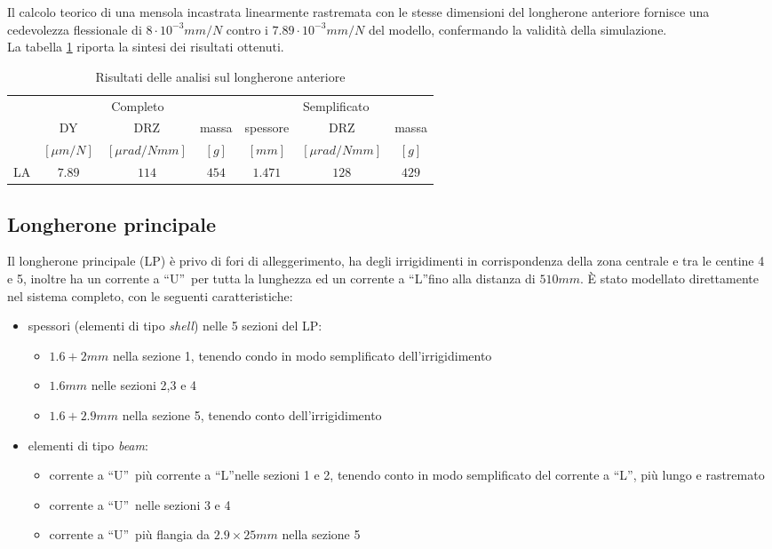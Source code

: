 \documentclass[
10pt, %
a4paper, %
oneside, %
headinclude,footinclude, %
BCOR5mm, %
]{scrartcl}
\begin{document}
Il calcolo teorico di una mensola incastrata linearmente rastremata con le stesse dimensioni del longherone anteriore fornisce una cedevolezza flessionale di $8\cdot10^{-3} mm/N$ contro i $7.89\cdot10^{-3} mm/N$ del modello, confermando la validità della simulazione.\\
La tabella \ref{tab:FS} riporta la sintesi dei risultati ottenuti.

\begin{table}[hbt]
	\caption{Risultati delle analisi sul longherone anteriore}
	\centering
	\begin{tabular}{rcccccc}
		\toprule
		& \multicolumn{3}{c}{Completo} & \multicolumn{3}{c}{Semplificato}\\
		\cmidrule(r){2-4} \cmidrule(l){5-7} 
		& DY  & DRZ & massa & spessore & DRZ  & massa \\
		& $[\mu m/N]$ & $[\mu rad/Nmm]$ & $[g]$ & $[mm]$ & $[\mu rad/Nmm]$ & $[g]$ \\
		\midrule
		LA & $7.89$ & $114$ & $454$ & $1.471$ & $128$ & $429$ \\
		\bottomrule
	\end{tabular}
	\label{tab:FS}
\end{table}


\subsection{Longherone principale}

Il longherone principale (LP) è privo di fori di alleggerimento, ha degli irrigidimenti in corrispondenza della zona centrale e tra le centine 4 e 5, inoltre ha un corrente a \textquotedblleft U\textquotedblright \ per tutta la lunghezza ed un corrente a \textquotedblleft L\textquotedblright fino alla distanza di $510mm$. \`{E} stato modellato direttamente nel sistema completo, con le seguenti caratteristiche:

\begin{itemize}
	\item spessori (elementi di tipo \emph{shell}) nelle 5 sezioni del LP:
	\begin{itemize}
		\item $1.6+2mm$ nella sezione 1, tenendo condo in modo semplificato dell'irrigidimento
		\item $1.6mm$ nelle sezioni 2,3 e 4
		\item $1.6+2.9mm$ nella sezione 5, tenendo conto dell'irrigidimento
	\end{itemize}
	\item elementi di tipo \emph{beam}:
	\begin{itemize}
		\item corrente a \textquotedblleft U\textquotedblright \ più corrente a \textquotedblleft L\textquotedblright nelle sezioni 1 e 2, tenendo conto in modo semplificato del corrente a \textquotedblleft L\textquotedblright, più lungo e rastremato
		\item corrente a \textquotedblleft U\textquotedblright \ nelle sezioni 3 e 4
		\item corrente a \textquotedblleft U\textquotedblright \ più flangia da $2.9 \times 25 mm$ nella sezione 5
	\end{itemize}
\end{itemize}
\end{document}
